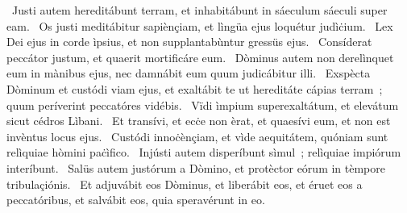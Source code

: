 ~Justi autem hereditábunt terram, et inhabitábunt in sáeculum sáeculi super eam. 
~Os justi meditábitur sapiènçiam, et lìngüa ejus loquétur judìċium. 
~Lex Dei ejus in corde ìpsius, et non supplantabùntur gressüs ejus. 
~Consíderat peccátor justum, et quaerit mortificáre eum. 
~Dòminus autem non derelìnquet eum in mànibus ejus, nec damnábit eum quum judicábitur illi. 
~Exspècta Dòminum et custódi viam ejus, et exaltábit te ut hereditáte cápias terram~; quum períverint peccatóres vidébis. 
~Vïdi ìmpium superexaltátum, et elevátum sicut cédros Lìbani. 
~Et transívi, et ecċe non èrat, et quaesívi eum, et non est invèntus locus ejus. 
~Custódi innoċènçiam, et vìde aequitátem, quóniam sunt relìquiae hòmini paċìfico. 
~Injústi autem disperíbunt sìmul~; relìquiae impiórum interíbunt. 
~Salüs autem justórum a Dòmino, et protèctor eórum in tèmpore tribulaçiónis. 
~Et adjuvábit eos Dòminus, et liberábit eos, et éruet eos a peccatóribus, et salvábit eos, quia speravérunt in eo. 
